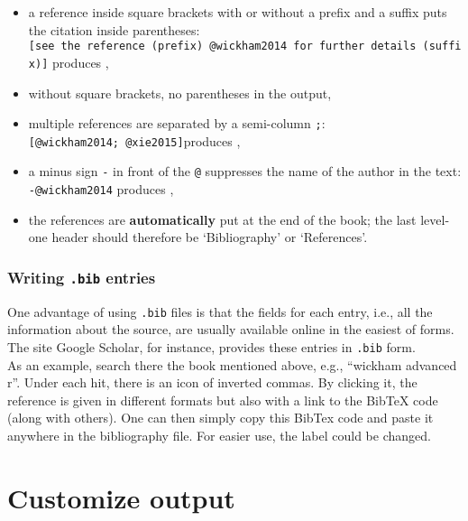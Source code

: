 \documentclass[]{book}
\providecommand{\tightlist}{%
  \setlength{\itemsep}{0pt}\setlength{\parskip}{0pt}}
\theoremstyle{definition}
\theoremstyle{definition}
\theoremstyle{definition}
\theoremstyle{remark}
\begin{document}
\begin{itemize}
\tightlist
\item
  a reference inside square brackets with or without a prefix and a
  suffix puts the citation inside parentheses:
  \texttt{{[}see\ the\ reference\ (prefix)\ @wickham2014\ for\ further\ details\ (suffix){]}}
  produces \citep[see the reference (prefix)][ for further details
  (suffix)]{wickham2014},
\item
  without square brackets, no parentheses in the output,
\item
  multiple references are separated by a semi-column \texttt{;}:
  \texttt{{[}@wickham2014;\ @xie2015{]}}produces
  \citep{wickham2014, xie2015},
\item
  a minus sign \texttt{-} in front of the \texttt{@} suppresses the name
  of the author in the text: \texttt{-@wickham2014} produces
  \citeyearpar{wickham2014},
\item
  the references are \textbf{automatically} put at the end of the book;
  the last level-one header should therefore be `Bibliography' or
  `References'.
\end{itemize}

\hypertarget{writing-.bib-entries}{%
\subsection{\texorpdfstring{Writing \texttt{.bib}
entries}{Writing .bib entries}}\label{writing-.bib-entries}}

One advantage of using \texttt{.bib} files is that the fields for each
entry, i.e., all the information about the source, are usually available
online in the easiest of forms.\\
The site Google Scholar, for instance, provides these entries in
\texttt{.bib} form.\\
As an example, search there the book mentioned above, e.g., ``wickham
advanced r''. Under each hit, there is an icon of inverted commas. By
clicking it, the reference is given in different formats but also with a
link to the BibTeX code (along with others). One can then simply copy
this BibTex code and paste it anywhere in the bibliography file. For
easier use, the label could be changed.

\hypertarget{custom-ouptut}{%
\chapter{Customize output}\label{custom-ouptut}}
\end{document}
